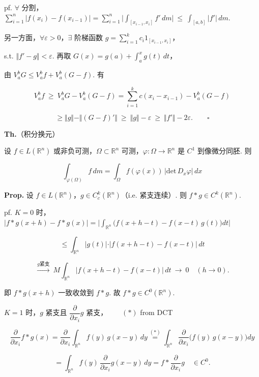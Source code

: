 \documentclass[11pt]{ctexart}
\theoremstyle{definition}
\begin{document}
pf. $\forall$ 分割，$\displaystyle\sum_{i=1}^{n} \vert f(x_i) - f(x_{i-1})\vert = \sum_{i=1}^{n} \Big\vert \int_{[x_{i-1}, x_i]} f' \, dm\Big\vert \ \leq\ \int_{[a,b]} \vert f'\vert \, dm$.

另一方面，$\forall \varepsilon > 0$，$\exists$ 阶梯函数 $g = \sum\limits_{i=1}^{k} c_i 1_{[x_{i-1}, x_i]}$，

s.t. $\Vert f' - g\Vert < \varepsilon$. 再取 $G(x) = g(a) + \displaystyle\int_a^x g(t)\, dt$，

由 $V_a^b G \leq V_a^b f + V_a^b(G - f)$. 有

\[
V_a^b f \ \geq\ V_a^b G - V_a^b(G - f) = \sum_{i=1}^{k} c(x_i - x_{i-1}) - V_a^b(G - f)
\]

\[
\geq \Vert g\Vert - \Vert (G - f)'\Vert \ \geq\ \Vert g\Vert - \varepsilon \ \geq\ \Vert f'\Vert - 2\varepsilon. \qquad \square
\]

\textbf{Th.}（积分换元）

设 $f \in L(\mathbb{R}^n)$ 或非负可测，$\Omega \subset \mathbb{R}^n$ 可测，$\varphi: \Omega \to \mathbb{R}^n$ 是 $C^1$ 到像微分同胚. 则

\[
\int_{\varphi(\Omega)} f \, dm = \int_{\Omega} f(\varphi(x))\, \vert \mathrm{det}\, D_x \varphi\vert \, dx
\]

\textbf{Prop.} 设 $f \in L(\mathbb{R}^n)$，$g \in C_c^k(\mathbb{R}^n)$（i.e. 紧支连续）. 则 $f * g \in C^k(\mathbb{R}^n)$.

pf. $K = 0$ 时，$\vert f * g(x+h) - f * g(x)\vert = \Big\vert \int_{\mathbb{R}^n} \big(f(x+h-t) - f(x-t)\, g(t)\big) dt\Big\vert$

\[
\leq \int_{\mathbb{R}^n} \vert g(t)\vert \cdot \vert f(x+h-t) - f(x-t)\vert \, dt
\]

\[
\xrightarrow{g \text{紧支}}\ M \int_{\mathbb{R}^n} \vert f(x+h-t) - f(x-t)\vert \, dt \ \to\ 0 \quad (h \to 0).
\]

即 $f * g(x+h)$ 一致收敛到 $f * g$. 故 $f * g \in C^0(\mathbb{R}^n)$.

$K = 1$ 时，$g$ 紧支且 $\dfrac{\partial}{\partial x_i} g$ 紧支，$\qquad (\ast)$ from DCT

\[
\dfrac{\partial}{\partial x_i} f * g(x) = \dfrac{\partial}{\partial x_i} \int_{\mathbb{R}^n} f(y)\, g(x-y)\, dy \overset{(\ast)}{=} \int_{\mathbb{R}^n} \dfrac{\partial}{\partial x_i}\big( f(y)\, g(x-y) \big) dy
\]

\[
= \int_{\mathbb{R}^n} f(y)\, \dfrac{\partial}{\partial x_i} g(x-y)\, dy = f * \dfrac{\partial}{\partial x_i} g \quad \in C^0.
\]
\end{document}
